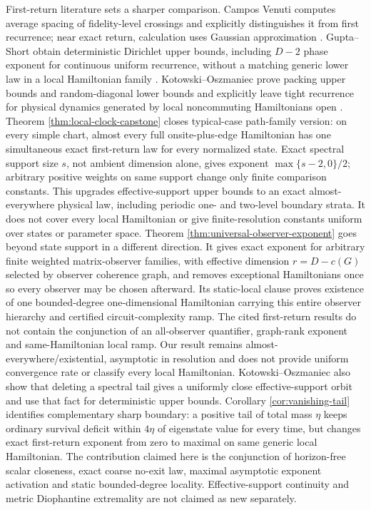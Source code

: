First-return literature sets a sharper comparison.  Campos Venuti computes
average spacing of fidelity-level crossings and explicitly distinguishes it
from first recurrence; near exact return, calculation uses Gaussian
approximation \cite{CamposVenuti2015}.  Gupta--Short obtain deterministic
Dirichlet upper bounds, including $D-2$ phase exponent for continuous uniform
recurrence, without a matching generic lower law in a local Hamiltonian family
\cite{GuptaShort2026}.  Kotowski--Oszmaniec prove packing upper bounds and
random-diagonal lower bounds and explicitly leave tight recurrence for
physical dynamics generated by local noncommuting Hamiltonians open
\cite{KotowskiOszmaniec2026}.  Theorem
\ref{thm:local-clock-capstone} closes typical-case path-family version: on
every simple chart, almost every full onsite-plus-edge Hamiltonian has one
simultaneous exact first-return law for every normalized state.  Exact
spectral support size $s$, not ambient dimension alone, gives exponent
$\max\{s-2,0\}/2$; arbitrary positive weights on same support change only
finite comparison constants.  This upgrades effective-support upper bounds
to an exact almost-everywhere physical law, including periodic one- and
two-level boundary strata.  It does not cover every local Hamiltonian or give
finite-resolution constants uniform over states or parameter space.
Theorem \ref{thm:universal-observer-exponent} goes beyond state support in a
different direction.  It gives exact exponent for arbitrary finite weighted
matrix-observer families, with effective dimension $r=D-c(G)$ selected by
observer coherence graph, and removes exceptional Hamiltonians once so every
observer may be chosen afterward.  Its static-local clause proves existence
of one bounded-degree one-dimensional Hamiltonian carrying this entire
observer hierarchy and certified circuit-complexity ramp.  The cited
first-return results do not contain the conjunction of an all-observer
quantifier, graph-rank exponent and same-Hamiltonian local ramp.  Our result
remains almost-everywhere/existential, asymptotic in resolution and
does not provide uniform convergence rate or classify every local
Hamiltonian.
Kotowski--Oszmaniec also show that deleting a spectral tail gives a uniformly
close effective-support orbit and use that fact for deterministic upper
bounds.  Corollary \ref{cor:vanishing-tail} identifies complementary sharp
boundary: a positive tail of total mass $\eta$ keeps ordinary survival deficit
within $4\eta$ of eigenstate value for every time, but changes exact
first-return exponent from zero to maximal on same generic local Hamiltonian.
The contribution claimed here is the conjunction of horizon-free scalar
closeness, exact coarse no-exit law, maximal asymptotic exponent activation and
static bounded-degree locality.  Effective-support continuity and metric
Diophantine extremality are not claimed as new separately.

